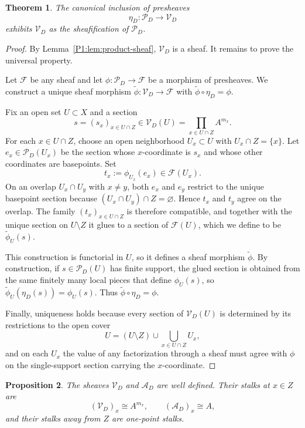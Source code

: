 \documentclass[11pt,a4paper]{article}
\numberwithin{equation}{section}
\newtheorem{theorem}{Theorem}[section]
\newtheorem{proposition}[theorem]{Proposition}
\theoremstyle{definition}
\theoremstyle{remark}
\newcommand{\cP}{\mathcal P}
\newcommand{\cV}{\mathcal V}
\newcommand{\cA}{\mathcal A}
\begin{document}
\begin{theorem}\label{P1:thm:sheafification}
The canonical inclusion of presheaves
\[
\eta_D:\cP_D\longrightarrow \cV_D
\]
exhibits $\cV_D$ as the sheafification of $\cP_D$.
\end{theorem}

\begin{proof}
By Lemma~\ref{P1:lem:product-sheaf}, $\cV_D$ is a sheaf.  It remains to prove the universal property.

Let $\mathcal F$ be any sheaf and let $\phi:\cP_D\to\mathcal F$ be a morphism of presheaves.  We construct a unique sheaf morphism $\widetilde\phi:\cV_D\to\mathcal F$ with $\widetilde\phi\circ\eta_D=\phi$.

Fix an open set $U\subset X$ and a section
\[
s=(s_x)_{x\in U\cap Z}\in\cV_D(U)=\prod_{x\in U\cap Z}A^{m_x}.
\]
For each $x\in U\cap Z$, choose an open neighborhood $U_x\subset U$ with $U_x\cap Z=\{x\}$.  Let $e_x\in\cP_D(U_x)$ be the section whose $x$-coordinate is $s_x$ and whose other coordinates are basepoints.  Set
\[
t_x:=\phi_{U_x}(e_x)\in\mathcal F(U_x).
\]
On an overlap $U_x\cap U_y$ with $x\neq y$, both $e_x$ and $e_y$ restrict to the unique basepoint section because $(U_x\cap U_y)\cap Z=\varnothing$.  Hence $t_x$ and $t_y$ agree on the overlap.  The family $(t_x)_{x\in U\cap Z}$ is therefore compatible, and together with the unique section on $U\setminus Z$ it glues to a section of $\mathcal F(U)$, which we define to be $\widetilde\phi_U(s)$.

This construction is functorial in $U$, so it defines a sheaf morphism $\widetilde\phi$.  By construction, if $s\in\cP_D(U)$ has finite support, the glued section is obtained from the same finitely many local pieces that define $\phi_U(s)$, so $\widetilde\phi_U(\eta_D(s))=\phi_U(s)$.  Thus $\widetilde\phi\circ\eta_D=\phi$.

Finally, uniqueness holds because every section of $\cV_D(U)$ is determined by its restrictions to the open cover
\[
U=(U\setminus Z)\cup\bigcup_{x\in U\cap Z}U_x,
\]
and on each $U_x$ the value of any factorization through a sheaf must agree with $\phi$ on the single-support section carrying the $x$-coordinate.
\end{proof}

\begin{proposition}\label{P1:prop:shadow-stalks}
The sheaves $\cV_D$ and $\cA_D$ are well defined.  Their stalks at $x\in Z$ are
\[
(\cV_D)_x\cong A^{m_x},\qquad (\cA_D)_x\cong A,
\]
and their stalks away from $Z$ are one-point stalks.
\end{proposition}
\end{document}

